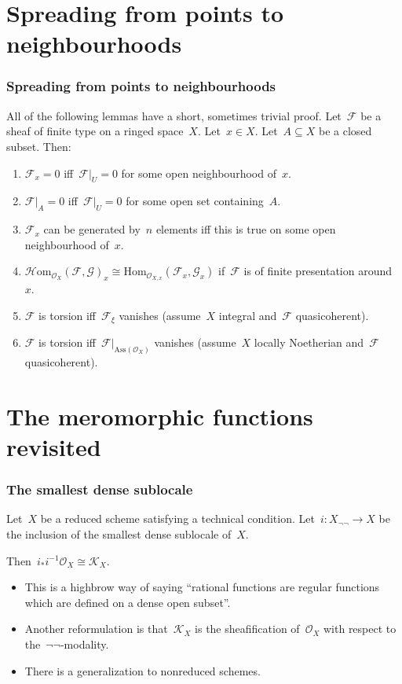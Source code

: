 \documentclass[12pt,utf8,notheorems,compress,t]{beamer}
\newcommand{\F}{\mathcal{F}}
\renewcommand{\G}{\mathcal{G}}
\renewcommand{\O}{\mathcal{O}}
\newcommand{\K}{\mathcal{K}}
\newcommand{\Hom}{\mathrm{Hom}}
\renewcommand{\_}{\mathpunct{.}}
\newcommand{\?}{\,{:}\,}
\begin{document}
\section{Spreading from points to neighbourhoods}

\begin{frame}\frametitle{Spreading from points to neighbourhoods}
  All of the following lemmas have a short, sometimes trivial proof.
  Let~$\F$ be a sheaf of finite type on a ringed space~$X$.
  Let~$x \in X$. Let~$A \subseteq X$ be a closed subset. Then:
  \small
  \begin{enumerate}
    \item $\F_x = 0$ iff~$\F|_U = 0$ for some open neighbourhood of~$x$.
    \item $\F|_A = 0$ iff~$\F|_U = 0$ for some open set containing~$A$.
    \item $\F_x$ can be generated by~$n$ elements iff this is true on some open
    neighbourhood of~$x$.
    \item $\mathcal{H}\mathrm{om}_{\O_X}(\F,\G)_x \cong
    \Hom_{\O_{X,x}}(\F_x,\G_x)$ if~$\F$ is of finite presentation around~$x$.
    \item $\F$ is torsion iff~$\F_\xi$ vanishes (assume~$X$ integral and~$\F$ quasicoherent).
    \item $\F$ is torsion iff~$\F|_{\mathrm{Ass}(\O_X)}$ vanishes (assume~$X$
    locally Noetherian and~$\F$ quasicoherent).
  \end{enumerate}
\end{frame}



\section{The meromorphic functions revisited}

\begin{frame}\frametitle{The smallest dense sublocale}\justifying
  Let~$X$ be a reduced scheme satisfying a technical condition.
  Let~$i : X_{\neg\neg} \to X$ be the inclusion of the smallest dense sublocale
  of~$X$.

  Then~$i_* i^{-1} \O_X \cong \K_X$.

  \begin{itemize}\justifying
    \item This is a highbrow way of saying ``rational functions are regular
    functions which are defined on a dense open subset''.
    \item Another reformulation is that~$\K_X$ is the sheafification of~$\O_X$
    with respect to the~$\neg\neg$-modality.
    \item There is a generalization to nonreduced schemes.
  \end{itemize}
\end{frame}
\end{document}
